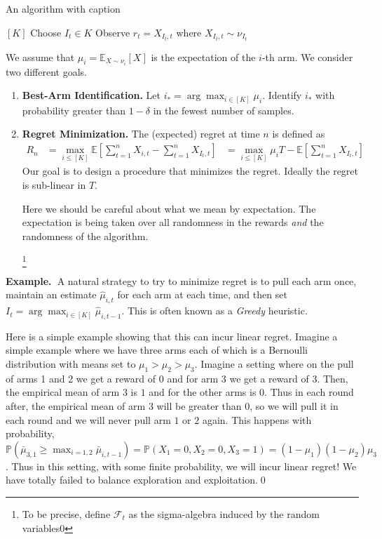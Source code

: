 \documentclass[11pt]{article}
\newcommand{\example}{\noindent\textbf{Example.\  }}
\renewcommand{\P}{\mathbb{P}}
\newcommand{\E}{\mathbb{E}}
\newcommand{\1}{\mathbf{1}}
\begin{document}
\begin{algorithm}
\caption{An algorithm with caption}\label{alg:cap}
\begin{algorithmic}
\State $[K]$
    \State Choose $I_t\in K$
    \State Observe $r_t = X_{I_t, t}$ where $X_{I_t,t} \sim \nu_{I_t}$
\EndFor
\EndIf 
\end{algorithmic}
\end{algorithm}


We assume that $\mu_i = \E_{X\sim \nu_i}[X]$ is the expectation of the $i$-th arm. We consider two different goals.
\begin{enumerate}
    \item \textbf{Best-Arm Identification.} Let $i_{\ast} = \arg\max_{i\in [K]}  \mu_i$. Identify $i_{\ast}$ with probability greater than $1-\delta$ in the fewest number of samples.
    \item \textbf{Regret Minimization.} The (expected) regret at time $n$ is defined as 
    \begin{align*}
        R_{n} &= \max_{i\leq [K]}\E\left[\sum_{t=1}^n X_{i, t} - \sum_{t=1}^n X_{I_t, t}\right]
              &= \max_{i\leq [K]} \mu_i T - \E[\sum_{t=1}^n X_{I_t, t}]
    \end{align*}
    Our goal is to design a procedure that minimizes the regret. Ideally the regret is sub-linear in $T$.
    
    Here we should be careful about what we mean by expectation. The expectation is being taken over all randomness in the rewards \textit{and} the randomness of the algorithm. 

    \footnote{To be precise, define $\mathcal{F}_t$ as the sigma-algebra induced by the random variables0 }
\end{enumerate}

\example A natural strategy to try to minimize regret is to pull each arm once, maintain an estimate $\hat{\mu}_{i,t}$ for each arm at each time, and then set $I_t = \arg\max_{i\in [K]} \hat{\mu}_{i,t-1}$. This is often known as a \textit{Greedy} heuristic. 

Here is a simple example showing that this can incur linear regret. Imagine a simple example where we have three arms each of which is a Bernoulli distribution with means set to $\mu_1 > \mu_2 > \mu_3$. 
Imagine a setting where on the pull of arms 1 and 2 we get a reward of $0$ and for arm $3$ we get a reward of $3$. Then, the empirical mean of arm $3$ is $1$ and for the other arms is $0$. Thus in each round after, the empirical mean of arm $3$ will be greater than $0$, so we will pull it in each round and we will never pull arm $1$ or $2$ again. This happens with probability,
$\P(\bar{\mu}_{3,1} \geq \max_{i=1,2} \bar{\mu}_{i, t-1}) = \P(X_{1}=0, X_2=0, X_3 = 1) = (1-\mu_1)(1-\mu_2)\mu_3$. Thus in this setting, with some finite probability, we will incur linear regret! We have totally failed to balance exploration and exploitation.\qed
\end{document}

